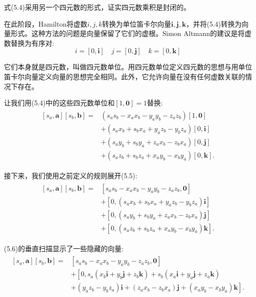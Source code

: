 式(5.4)采用另一个四元数的形式，证实四元数乘积是封闭的。

在此阶段，Hamilton将虚数$i, j, k$转换为单位笛卡尔向量$\mathbf{i}, \mathbf{j}, \mathbf{k}$，并将(5.4)转换为向量形式。这种方法的问题是向量保留了它们的虚根。Simon Altmann的建议是将虚数替换为有序对:
$$
i=[0, \mathbf{i}] \quad j=[0, \mathbf{j}] \quad k=[0, \mathbf{k}]
$$

它们本身就是四元数，叫做四元数单位。用四元数单位定义四元数的思想与用单位笛卡尔向量定义向量的思想完全相同。此外，它允许向量在没有任何虚数关联的情况下存在。

让我们用(5.4)中的这些四元数单位和$[1,\mathbf{0}]=1$替换:
\begin{align}
    \begin{aligned}
        {\left[s_{a}, \mathbf{a}\right]\left[s_{b}, \mathbf{b}\right]=} & \left(s_{a} s_{b}-x_{a} x_{b}-y_{a} y_{b}-z_{a} z_{b}\right)[1, \mathbf{0}] \\
        & +\left(s_{a} x_{b}+s_{b} x_{a}+y_{a} z_{b}-y_{b} z_{a}\right)[0, \mathbf{i}] \\
        & +\left(s_{a} y_{b}+s_{b} y_{a}+z_{a} x_{b}-z_{b} x_{a}\right)[0, \mathbf{j}] \\
        & +\left(s_{a} z_{b}+s_{b} z_{a}+x_{a} y_{b}-x_{b} y_{a}\right)[0, \mathbf{k}] .
    \end{aligned}
\end{align}



接下来，我们使用之前定义的规则展开(5.5):
\begin{align}
    \begin{aligned}
        {\left[s_{a}, \mathbf{a}\right]\left[s_{b}, \mathbf{b}\right]=} & {\left[s_{a} s_{b}-x_{a} x_{b}-y_{a} y_{b}-z_{a} z_{b}, \mathbf{0}\right] } \\
        & +\left[0,\left(s_{a} x_{b}+s_{b} x_{a}+y_{a} z_{b}-y_{b} z_{a}\right) \mathbf{i}\right] \\
        & +\left[0,\left(s_{a} y_{b}+s_{b} y_{a}+z_{a} x_{b}-z_{b} x_{a}\right) \mathbf{j}\right] \\
        & +\left[0,\left(s_{a} z_{b}+s_{b} z_{a}+x_{a} y_{b}-x_{b} y_{a}\right) \mathbf{k}\right] .
    \end{aligned} 
\end{align}

(5.6)的垂直扫描显示了一些隐藏的向量:
\begin{align}
    \begin{aligned}
        {\left[s_{a}, \mathbf{a}\right]\left[s_{b}, \mathbf{b}\right]=} & {\left[s_{a} s_{b}-x_{a} x_{b}-y_{a} y_{b}-z_{a} z_{b}, \mathbf{0}\right] } \\
        & +\left[0, s_{a}\left(x_{b} \mathbf{i}+y_{b} \mathbf{j}+z_{b} \mathbf{k}\right)+s_{b}\left(x_{a} \mathbf{i}+y_{a} \mathbf{j}+z_{a} \mathbf{k}\right)\right. \\
        & \left.+\left(y_{a} z_{b}-y_{b} z_{a}\right) \mathbf{i}+\left(z_{a} x_{b}-z_{b} x_{a}\right) \mathbf{j}+\left(x_{a} y_{b}-x_{b} y_{a}\right) \mathbf{k}\right] .
    \end{aligned}
\end{align}

